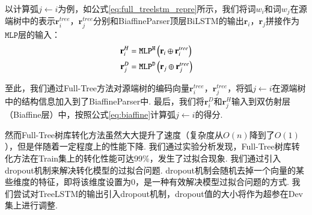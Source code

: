以计算弧$j \leftarrow i$为例，如公式\ref{eq:full_treelstm_repre}所示，我们将词$w_i$和词$w_j$在源端树中的表示$\mathbf{r}_i^{tree}$，$\mathbf{r}_j^{tree}$分别和BiaffineParser顶层BiLSTM的输出$\mathbf{r}_i$，$\mathbf{r}_j$拼接作为$\texttt{MLP}$层的输入：
\begin{equation}
    \label{eq:full_treelstm_repre}
    \setlength{\abovedisplayskip}{10pt}
    \setlength{\belowdisplayskip}{10pt}
    \begin{split}
        \mathbf{r}_i^H &= \texttt{MLP}^\texttt{H} \left(\mathbf{r}_i \oplus \mathbf{r}_i^{tree}\right) \\
        \mathbf{r}_j^D &= \texttt{MLP}^\texttt{D} \left(\mathbf{r}_j \oplus \mathbf{r}_j^{tree}\right)
    \end{split}
\end{equation}

至此，我们通过Full-Tree方法对源端树的编码向量$\mathbf{r}_i^{tree}$，$\mathbf{r}_j^{tree}$，将弧$j \leftarrow i$在源端树中的结构信息加入到了BiaffineParser中. 最后，我们将$\mathbf{r}_i^D$和$\mathbf{r}_j^H$输入到双仿射层（Biaffine层）中，按照公式\ref{eq:biaffine}计算弧$j \leftarrow i$的得分.

然而Full-Tree树库转化方法虽然大大提升了速度（复杂度从$O(n)$降到了$O(1)$），但是伴随着一定程度上的性能下降. 我们通过实验分析发现，Full-Tree树库转化方法在Train集上的转化性能可达99\%，发生了过拟合现象. 我们通过引入dropout机制来解决转化模型的过拟合问题. dropout机制会随机去掉一个向量的某些维度的特征，即将该维度设置为0，是一种有效解决模型过拟合问题的方式. 我们尝试对TreeLSTM的输出引入dropout机制，dropout值的大小将作为超参在Dev集上进行调整.


